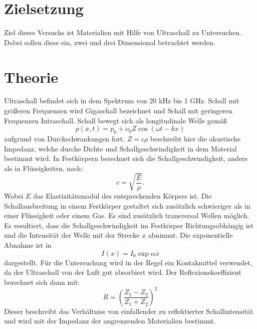 \section{Zielsetzung}
Ziel dieses Versuchs ist Materialien mit Hilfe von Ultraschall zu Untersuchen.
Dabei sollen diese ein, zwei und drei Dimensional betrachtet werden.
\section{Theorie}
\label{sec:Theorie}
Ultraschall befindet sich in dem Spektrum von 20 kHz bis 1 GHz.
Schall mit größeren Frequenzen wird Gigaschall bezeichnet und Schall mit geringeren Frequenzen Intraschall.
Schall bewegt sich als longitudinale Welle gemäß
\begin{equation}
  p(x,t) = p_0 + \nu_0 Z \cos{(\omega t - k x)}
\end{equation}
 aufgrund von Durckschwankungen fort.
 $Z=c \rho$ beschreibt hier die akustische Impedanz, welche durche Dichte und Schallgeschwindigkeit in dem Material bestimmt wird.
 In Festkörpern berechnet sich die Schallgeschwindigkeit, anders als in Flüssigkeiten, nach:
 \begin{equation}
  c=\sqrt{\frac{E}{\rho}}   .
 \end{equation}
Wobei $E$ das Elastizitätsmodul des entsprechenden Körpers ist.
Die Schallausbreitung in einem Festkörper gestaltet sich zusätzlich schwieriger als in einer Flüssigkeit oder einem Gas.
Es sind zusätzlich transversal Wellen möglich.
Es resultiert, dass die Schallgeschwindigkeit im Festkörper Richtungsabhängig ist und die Intensität der Welle mit der Strecke $x$ abnimmt.
Die exponentielle Abnahme ist in
\begin{equation}
  I(x) = I_0 \exp{\alpha x}
\end{equation}
dargestellt.
Für die Untersuchung wird in der Regel ein Kontakmittel verwendet, da der Ultraschall von der Luft gut absorbiert wird.
Der Reflexionskoeffizient berechnet sich dann mit:
\begin{equation}
  R=\left(\frac{Z_1 - Z_2}{Z_1 + Z_2}\right)^2
\end{equation}
Dieser beschreibt das Verhältniss von einfallender zu reflektierter Schallintensität und wird mit der Impedanz der angrenzenden Materialien bestimmt.
